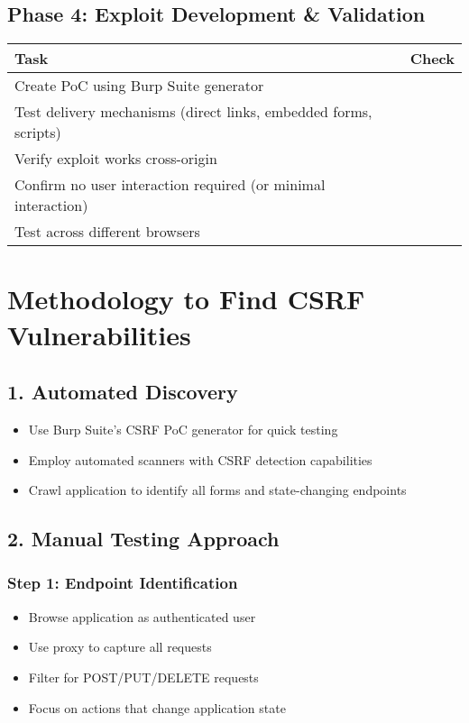 \documentclass{article}
\begin{document}
\subsection*{Phase 4: Exploit Development \& Validation}
\begin{tabular}{>{\raggedright\arraybackslash}p{}c}
    \toprule
    \textbf{Task} & \textbf{Check} \\
    \midrule
    Create PoC using Burp Suite generator \\
    Test delivery mechanisms (direct links, embedded forms, scripts)  \\
    Verify exploit works cross-origin \\
    Confirm no user interaction required (or minimal interaction)  \\
    Test across different browsers \\
    \bottomrule
\end{tabular}

\section*{Methodology to Find CSRF Vulnerabilities}

\subsection*{1. Automated Discovery}
\begin{itemize}
    \item Use Burp Suite's CSRF PoC generator for quick testing
    \item Employ automated scanners with CSRF detection capabilities
    \item Crawl application to identify all forms and state-changing endpoints
\end{itemize}

\subsection*{2. Manual Testing Approach}

\subsubsection*{Step 1: Endpoint Identification}
\begin{itemize}
    \item Browse application as authenticated user
    \item Use proxy to capture all requests
    \item Filter for POST/PUT/DELETE requests
    \item Focus on actions that change application state
\end{itemize}
\end{document}
